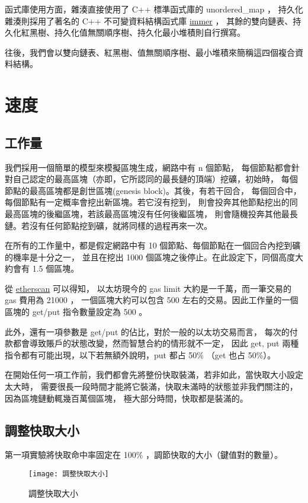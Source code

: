 函式庫使用方面，雜湊直接使用了 C++ 標準函式庫的 unordered\_map ，
持久化雜湊則採用了著名的 C++ 不可變資料結構函式庫 \href{https://sinusoid.es/immer/}{immer} ，
其餘的雙向鏈表、持久化紅黑樹、持久化值無關順序樹、持久化最小堆積則自行撰寫。

往後，我們會以雙向鏈表、紅黑樹、值無關順序樹、最小堆積來簡稱這四個複合資料結構。

\section{速度}

\subsection{工作量}
我們採用一個簡單的模型來模擬區塊生成，網路中有 n 個節點，
每個節點都會針對自己認定的最高區塊（亦即，它所認同的最長鏈的頂端）挖礦，初始時，
每個節點的最高區塊都是創世區塊(genesis block)。其後，有若干回合，
每個回合中，每個節點有一定概率會挖出新區塊。若它沒有挖到，
則會投奔其他節點挖出的同最高區塊的後繼區塊，若該最高區塊沒有任何後繼區塊，
則會隨機投奔其他最長鏈。若沒有任何節點挖到礦，就將同樣的過程再來一次。

在所有的工作量中，都是假定網路中有 10 個節點、每個節點在一個回合內挖到礦的機率是十分之一，
並且在挖出 1000 個區塊之後停止。在此設定下，同個高度大約會有 1.5 個區塊。

從 \href{https://etherscan.io/chart/gaslimit}{etherscan} 可以得知，
以太坊現今的 gas limit 大約是一千萬，而一筆交易的 gas 費用為 21000 ，
一個區塊大約可以包含 500 左右的交易。因此工作量的一個區塊的 get/put 指令數量設定為 500 。

此外，還有一項參數是 get/put 的佔比，對於一般的以太坊交易而言，
每次的付款都會導致賬戶的狀態改變，然而智慧合約的情形就不一定，
因此 get, put 兩種指令都有可能出現，以下若無額外說明，put 都占 50\% （get 也占 50\%）。

在開始任何一項工作前，我們都會先將整份快取裝滿，若非如此，當快取大小設定太大時，
需要很長一段時間才能將它裝滿，快取未滿時的狀態並非我們關注的，因為區塊鏈動輒幾百萬個區塊，
極大部分時間，快取都是裝滿的。

\subsection{調整快取大小}

第一項實驗將快取命中率固定在 100\% ，調節快取的大小（鍵值對的數量）。

\begin{figure}[h!]
\texttt{[image: 調整快取大小]}
\caption{調整快取大小}
\end{figure}

